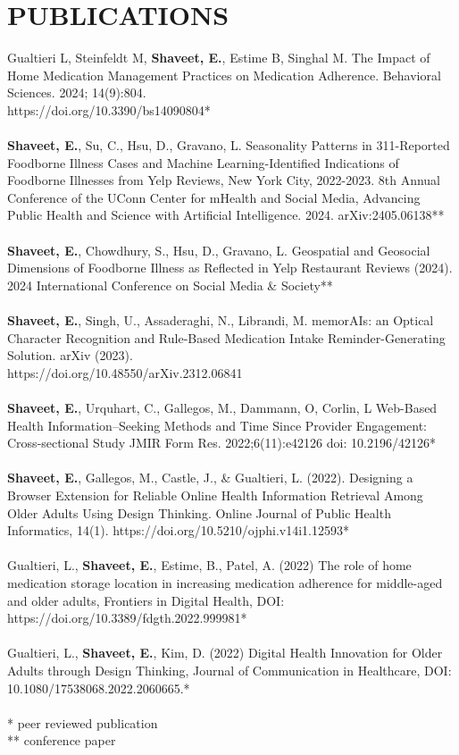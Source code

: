 \documentclass[a4paper,12pt]{article}
\begin{document}
{\section*{PUBLICATIONS}
Gualtieri L, Steinfeldt M, \textbf{Shaveet, E.}, Estime B, Singhal M. The Impact of Home Medication Management Practices on Medication Adherence. Behavioral Sciences. 2024; 14(9):804.\\ https://doi.org/10.3390/bs14090804*\\
\\
\textbf{Shaveet, E.}, Su, C., Hsu, D., Gravano, L. Seasonality Patterns in 311-Reported Foodborne Illness Cases and Machine Learning-Identified Indications of Foodborne Illnesses from Yelp Reviews, New York City, 2022-2023. 8th Annual Conference of the UConn Center for mHealth and Social Media, Advancing Public Health and Science with Artificial Intelligence. 2024. arXiv:2405.06138**\\
\\
\textbf{Shaveet, E.}, Chowdhury, S., Hsu, D., Gravano, L. Geospatial and Geosocial Dimensions of Foodborne Illness as Reflected in Yelp Restaurant Reviews (2024). 2024 International Conference on Social Media \& Society**\\
\\
\textbf{Shaveet, E.}, Singh, U., Assaderaghi, N., Librandi, M. memorAIs: an Optical Character Recognition and Rule-Based Medication Intake Reminder-Generating Solution. arXiv (2023). \\https://doi.org/10.48550/arXiv.2312.06841\\
\\
\textbf{Shaveet, E.}, Urquhart, C., Gallegos, M., Dammann, O, Corlin, L Web-Based Health Information–Seeking Methods and Time Since Provider Engagement: Cross-sectional Study JMIR Form Res. 2022;6(11):e42126 doi: 10.2196/42126*\\
\\
\textbf{Shaveet, E.}, Gallegos, M., Castle, J., \& Gualtieri, L. (2022). Designing a Browser Extension for Reliable Online Health Information Retrieval Among Older Adults Using Design Thinking. Online Journal of Public Health Informatics, 14(1). https://doi.org/10.5210/ojphi.v14i1.12593*\\
\\
Gualtieri, L., \textbf{Shaveet, E.}, Estime, B., Patel, A. (2022) The role of home medication storage location in increasing medication adherence for middle-aged and older adults, Frontiers in Digital Health, DOI: https://doi.org/10.3389/fdgth.2022.999981*\\
\\
Gualtieri, L., \textbf{Shaveet, E.}, Kim, D. (2022) Digital Health Innovation for Older Adults through Design Thinking, Journal of Communication in Healthcare, DOI: 10.1080/17538068.2022.2060665.*\\
\\
\footnotesize{* peer reviewed publication}\\
\footnotesize{** conference paper}\\
}
\end{document}
